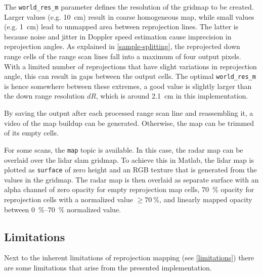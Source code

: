 The \texttt{world\_res\_m} parameter defines the resolution of the gridmap to be created. Larger values (e.g. \SI{10}{cm}) result in coarse homogeneous map, while small values (e.g. \SI{1}{cm}) lead to unmapped area between reprojection lines. The latter is because noise and jitter in Doppler speed estimation cause imprecision in reprojection angles. As explained in \cref{sample-splitting}, the reprojected down range cells of the range scan lines fall into a maximum of four output pixels. With a limited number of reprojections that have slight variations in reprojection angle, this can result in gaps between the output cells. The optimal \texttt{world\_res\_m} is hence somewhere between these extremes, a good value is slightly larger than the down range resolution $dR$, which is around \SI{2.1}{cm} in this implementation.

By saving the output after each processed range scan line and reassembling it, a video of the map buildup can be generated. Otherwise, the map can be trimmed of its empty cells.

For some scans, the \texttt{map} topic is available. In this case, the radar map can be overlaid over the lidar slam gridmap. To achieve this in Matlab, the lidar map is plotted as \texttt{surface} of zero height and an RGB texture that is generated from the values in the gridmap. The radar map is then overlaid as separate surface with an alpha channel of zero opacity for empty reprojection map cells, \SI{70}{\%} opacity for reprojection cells with a normalized value $\ge \SI{70}{\%}$, and linearly mapped opacity between \SIrange{0}{70}{\%} normalized value.

\subsection{Limitations}\label{limitations-1}

Next to the inherent limitations of reprojection mapping (see \cref{limitations}) there are some limitations that arise from the presented implementation.


